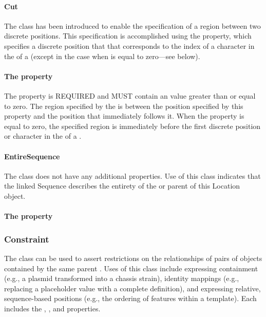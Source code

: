 \paragraph{Cut}
\label{sec:Cut}
The  class has been introduced to enable the specification of a region between two discrete positions.
This specification is accomplished using the  property, which specifies a discrete position that that corresponds to the index of a character in the   of a  (except in the case when  is equal to zero---see below).

\paragraph{The  property}
\label{sec:at}
The  property is REQUIRED and MUST contain an  value greater than or equal to zero. The region specified by the  is between the position specified by this property and the position that immediately follows it. When the  property is equal to zero, the specified region is immediately before the first discrete position or character in the   of a .


\paragraph{EntireSequence}
\label{sec:EntireSequence}
The  class does not have any additional properties. Use of this class indicates that the linked Sequence describes the entirety of the  or  parent of this Location object.

\paragraph{The  property}
\label{sec:order}


\subsubsection{Constraint}
\label{sec:Constraint}
The  class can be used to assert restrictions on the relationships of pairs of  objects contained by the same parent .
Uses of this class include expressing containment (e.g., a plasmid transformed into a chassis strain), identity mappings (e.g., replacing a placeholder value with a complete definition), and expressing relative, sequence-based positions (e.g., the ordering of features within a template).
Each  includes the , , and  properties.

